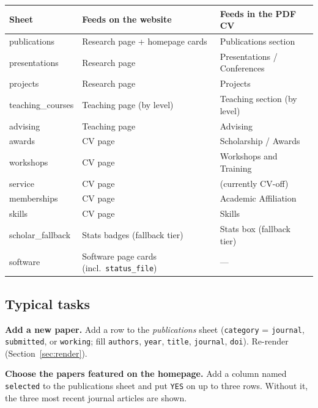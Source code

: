\documentclass[11pt,a4paper]{article}
\begin{document}
\begin{center}
\begin{tabular}{@{}lll@{}}
\toprule
\textbf{Sheet} & \textbf{Feeds on the website} & \textbf{Feeds in the PDF CV} \\
\midrule
publications     & Research page + homepage cards & Publications section \\
presentations    & Research page                  & Presentations / Conferences \\
projects         & Research page                  & Projects \\
teaching\_courses & Teaching page (by level)      & Teaching section (by level) \\
advising         & Teaching page                  & Advising \\
awards           & CV page                        & Scholarship / Awards \\
workshops        & CV page                        & Workshops and Training \\
service          & CV page                        & (currently CV-off) \\
memberships      & CV page                        & Academic Affiliation \\
skills           & CV page                        & Skills \\
scholar\_fallback & Stats badges (fallback tier)  & Stats box (fallback tier) \\
software         & Software page cards (incl.\ \texttt{status\_file}) & --- \\
\bottomrule
\end{tabular}
\end{center}

\subsection{Typical tasks}

\textbf{Add a new paper.} Add a row to the \emph{publications} sheet
(\texttt{category} = \texttt{journal}, \texttt{submitted}, or
\texttt{working}; fill \texttt{authors}, \texttt{year}, \texttt{title},
\texttt{journal}, \texttt{doi}). Re-render (Section~\ref{sec:render}).

\textbf{Choose the papers featured on the homepage.} Add a column named
\texttt{selected} to the publications sheet and put \texttt{YES} on up to
three rows. Without it, the three most recent journal articles are shown.
\end{document}

